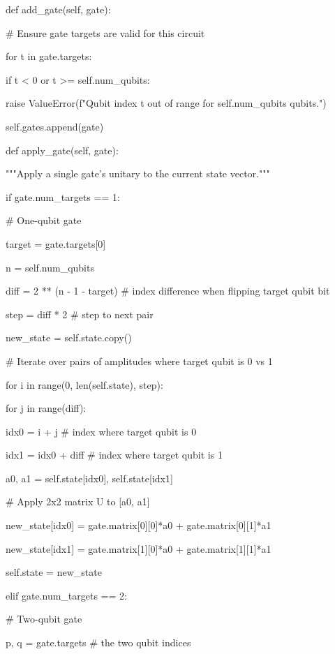 \documentclass[%
oneside,                 %
final,                   %
10pt]{article}
\begin{document}
    def add_gate(self, gate):

        # Ensure gate targets are valid for this circuit

        for t in gate.targets:

            if t < 0 or t >= self.num_qubits:

                raise ValueError(f"Qubit index {t} out of range for {self.num_qubits} qubits.")

        self.gates.append(gate)



    def apply_gate(self, gate):

        """Apply a single gate's unitary to the current state vector."""

        if gate.num_targets == 1:

            # One-qubit gate

            target = gate.targets[0]

            n = self.num_qubits

            diff = 2 ** (n - 1 - target)        # index difference when flipping target qubit bit

            step = diff * 2                    # step to next pair

            new_state = self.state.copy()

            # Iterate over pairs of amplitudes where target qubit is 0 vs 1

            for i in range(0, len(self.state), step):

                for j in range(diff):

                    idx0 = i + j             # index where target qubit is 0

                    idx1 = idx0 + diff       # index where target qubit is 1

                    a0, a1 = self.state[idx0], self.state[idx1]

                    # Apply 2x2 matrix U to [a0, a1]

                    new_state[idx0] = gate.matrix[0][0]*a0 + gate.matrix[0][1]*a1

                    new_state[idx1] = gate.matrix[1][0]*a0 + gate.matrix[1][1]*a1

            self.state = new_state

        elif gate.num_targets == 2:

            # Two-qubit gate

            p, q = gate.targets  # the two qubit indices
\end{document}
